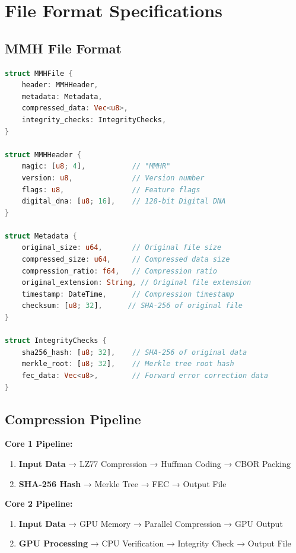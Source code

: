 \documentclass[12pt,a4paper]{article}
\begin{document}
\section{File Format Specifications}

\subsection{MMH File Format}

\begin{lstlisting}[language=Rust, caption=MMH File Structure]
struct MMHFile {
    header: MMHHeader,
    metadata: Metadata,
    compressed_data: Vec<u8>,
    integrity_checks: IntegrityChecks,
}

struct MMHHeader {
    magic: [u8; 4],           // "MMHR"
    version: u8,              // Version number
    flags: u8,                // Feature flags
    digital_dna: [u8; 16],    // 128-bit Digital DNA
}

struct Metadata {
    original_size: u64,       // Original file size
    compressed_size: u64,     // Compressed data size
    compression_ratio: f64,   // Compression ratio
    original_extension: String, // Original file extension
    timestamp: DateTime,      // Compression timestamp
    checksum: [u8; 32],      // SHA-256 of original file
}

struct IntegrityChecks {
    sha256_hash: [u8; 32],    // SHA-256 of original data
    merkle_root: [u8; 32],    // Merkle tree root hash
    fec_data: Vec<u8>,        // Forward error correction data
}
\end{lstlisting}

\subsection{Compression Pipeline}

\textbf{Core 1 Pipeline:}
\begin{enumerate}
    \item \textbf{Input Data} → LZ77 Compression → Huffman Coding → CBOR Packing
    \item \textbf{SHA-256 Hash} → Merkle Tree → FEC → Output File
\end{enumerate}

\textbf{Core 2 Pipeline:}
\begin{enumerate}
    \item \textbf{Input Data} → GPU Memory → Parallel Compression → GPU Output
    \item \textbf{GPU Processing} → CPU Verification → Integrity Check → Output File
\end{enumerate}
\end{document}
